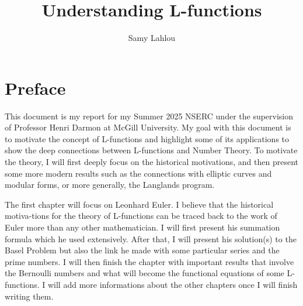 \documentclass[oneside, 12pt]{book}
\title{\Huge Understanding L-functions}
\author{Samy Lahlou}
\date{}
\theoremstyle{plain}
\theoremstyle{definition}
\numberwithin{equation}{section}
\begin{document}
\maketitle 

\frontmatter

\chapter*{Preface}

This document is my report for my Summer 2025 NSERC under the supervision of Professor Henri Darmon at McGill University. My goal with this document is to motivate the concept of L-functions and highlight some of its applications to show the deep connections between L-functions and Number Theory. To motivate the theory, I will first deeply focus on the historical motivations, and then present some more modern results such as the connections with elliptic curves and modular forms, or more generally, the Langlands program.

The first chapter will focus on Leonhard Euler. I believe that the historical motiva-tions for the theory of L-functions can be traced back to the work of Euler more than any other mathematician. I will first present his summation formula which he used extensively. After that, I will present his solution(s) to the Basel Problem but also the link he made with some particular series and the prime numbers. I will then finish the chapter with important results that involve the Bernoulli numbers and what will become the functional equations of some L-functions. I will add more informations about the other chapters once I will finish writing them.
\end{document}

